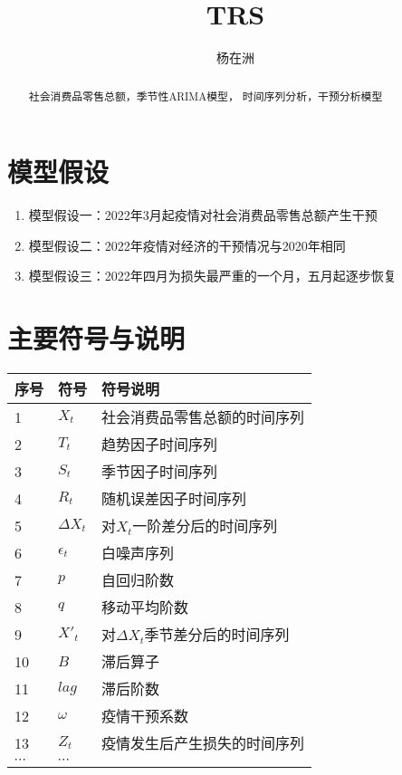 \documentclass[12pt,a4paper]{nmmcm}
\title{TRS}
\date{}
\newcommand{\headcol}{\rowcolor{tableheadcolor}}
\begin{document}
\author{杨在洲}
\begin{abstract}


\begin{keywords}
{\song\xiaosihao
社会消费品零售总额，季节性ARIMA模型， 时间序列分析，干预分析模型}
\end{keywords}


\end{abstract}
\maketitle
\renewcommand{\contentsname}{\centerline{\sanhao\bfseries\HEI 目\quad 录}}
\tableofcontents


\newpage
\setcounter{page}{1}
\pagestyle{fancy}
\song\xiaosihao


\section{模型假设}
\begin{enumerate}
  \item 模型假设一：2022年3月起疫情对社会消费品零售总额产生干预
  \item 模型假设二：2022年疫情对经济的干预情况与2020年相同
  \item 模型假设三：2022年四月为损失最严重的一个月，五月起逐步恢复
\end{enumerate}

\section{主要符号与说明}

\begin{table}[h!]
  \centering
  \small
  \begin{tabular}{p{60pt}<{\centering}|p{60pt}<{\centering}p{180pt}<{\raggedright}}
   \hline
   \headcol 序号 & 符号 & 符号说明 \\
   \hline
    1 & $X_t$ & 社会消费品零售总额的时间序列 \\
    2 & $T_t$ & 趋势因子时间序列 \\
    3 & $S_t$ & 季节因子时间序列 \\
    4 & $R_t$ & 随机误差因子时间序列 \\
    5 & $\Delta X_t$ & 对\(X_t\)一阶差分后的时间序列 \\
    6 & $\epsilon_t$ & 白噪声序列 \\
    7 & $p$ & 自回归阶数 \\
    8 & $q$ & 移动平均阶数 \\
    9 & $X'_t$ & 对\(\Delta X_t\)季节差分后的时间序列 \\
    10 & $B$ & 滞后算子 \\
    11 & $lag$ & 滞后阶数 \\
    12 & $\omega$ & 疫情干预系数 \\
    13 & $Z_t$ & 疫情发生后产生损失的时间序列 \\
    $\cdots$ & $\cdots$\\
    \hline
  \end{tabular}
  \label{symbol}
\end{table}
\end{document}

